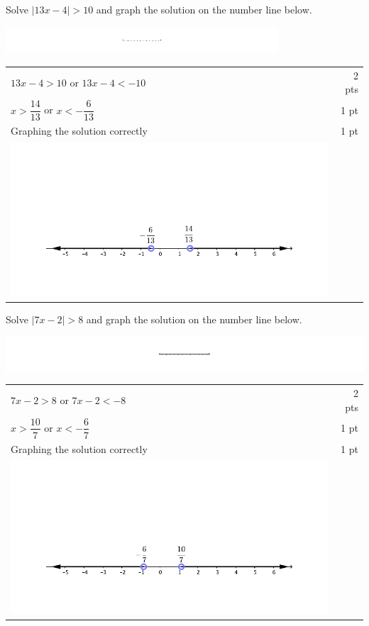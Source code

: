 {
      Solve $| 13x-4| > 10$ and graph the solution on the number line below.
      
\includegraphics[width=4in]{NumberLine_19_5.pdf}
}
{

	\begin{tabular}{l r}
	$13x-4 > 10$ or $13x-4 < -10$ & 2 pts\\
	$x>\dfrac{14}{13}$ or $x< -\dfrac{6}{13}$ & 1 pt\\
	Graphing the solution correctly& 1 pt \\
	\includegraphics[width=5in]{NumberLine_19_5c.pdf}
	\end{tabular}
	

}

{
      Solve $| 7x-2 | > 8$ and graph the solution on the number line below.
      
\includegraphics[width=6in]{NumberLine_19_5.pdf}
}
{
	\begin{tabular}{l r}
	$7x-2>8$ or $7x-2<-8$ & 2 pts\\
	$x>\dfrac{10}{7}$ or $x< -\dfrac{6}{7}$ & 1 pt\\
	Graphing the solution correctly& 1 pt \\
	\includegraphics[width=5in]{NumberLine_19_5d.pdf}
	\end{tabular}
	

}